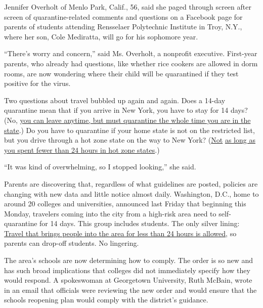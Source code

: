 Jennifer Overholt of Menlo Park, Calif., 56, said she paged through
screen after screen of quarantine-related comments and questions on a
Facebook page for parents of students attending Rensselaer Polytechnic
Institute in Troy, N.Y., where her son, Cole Mediratta, will go for his
sophomore year.

``There's worry and concern,'' said Ms. Overholt, a nonprofit executive.
First-year parents, who already had questions, like whether rice cookers
are allowed in dorm rooms, are now wondering where their child will be
quarantined if they test positive for the virus.

Two questions about travel bubbled up again and again. Does a 14-day
quarantine mean that if you arrive in New York, you have to stay for 14
days? (No,
\href{https://coronavirus.health.ny.gov/system/files/documents/2020/06/interimguidance_traveladvisory.pdf}{you
can leave anytime, but must quarantine the whole time you are in the
state}.) Do you have to quarantine if your home state is not on the
restricted list, but you drive through a hot zone state on the way to
New York?
(\href{https://coronavirus.health.ny.gov/system/files/documents/2020/06/interimguidance_traveladvisory.pdf}{Not}
\href{https://coronavirus.health.ny.gov/system/files/documents/2020/06/interimguidance_traveladvisory.pdf}{as
long as you spent fewer than 24 hours in hot zone states}.)

``It was kind of overwhelming, so I stopped looking,'' she said.

Parents are discovering that, regardless of what guidelines are posted,
policies are changing with new data and little notice almost daily.
Washington, D.C., home to around 20 colleges and universities, announced
last Friday that beginning this Monday, travelers coming into the city
from a high-risk area need to self-quarantine for 14 days. This group
includes students. The only silver lining:
\href{https://coronavirus.dc.gov/page/mayor\%E2\%80\%99s-order-2020-081-requirement-self-quarantine-after-non-essential-travel-during-covid-19}{Travel
that brings people into the area for less than 24 hours is allowed}, so
parents can drop-off students. No lingering.

The area's schools are now determining how to comply. The order is so
new and has such broad implications that colleges did not immediately
specify how they would respond. A spokeswoman at Georgetown University,
Ruth McBain, wrote in an email that officials were reviewing the new
order and would ensure that the schools reopening plan would comply with
the district's guidance.

